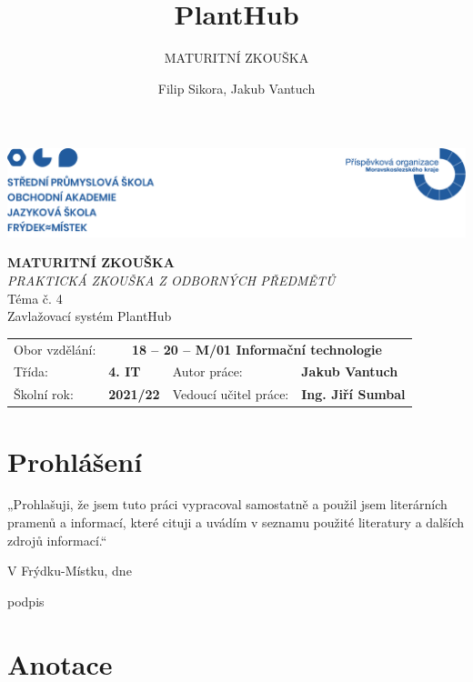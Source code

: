 \documentclass[12pt,a4paper]{article}
\title{PlantHub}
\subtitle{MATURITNÍ ZKOUŠKA }
\author{Filip Sikora, Jakub Vantuch}
\date{}
\newcommand*\wildcard[2][5cm]{\vspace*{2cm}\parbox{#1}{\centering\hrulefill\par#2\par}}
\begin{document}
\begin{titlepage}
	\noindent\includegraphics[width=\linewidth]{header.png}
	\vspace{1cm} \\
	\begin{center}
		\Huge\textbf{MATURITNÍ ZKOUŠKA}
		\vspace*{1.2cm} \\
		\large \emph{PRAKTICKÁ ZKOUŠKA Z ODBORNÝCH PŘEDMĚTŮ}
		\vspace*{5cm} \\
		\Large Téma č. 4 \\
		\vspace*{1cm}
		\Large Zavlažovací systém PlantHub \\
		\vfill
		\normalsize
	\end{center}
	\begin{tabularx}{\textwidth}{l@{\hskip 1.8cm}XXl}
		Obor vzdělání:        & \multicolumn{3}{c}{\textbf{18 – 20 –
				M/01
				Informační technologie}}
		\\[10pt]
		Třída:                & \textbf{4. IT}
		                      &
		Autor práce:          & \textbf{Jakub Vantuch}
		\\[10pt]
		Školní rok:           & \textbf{2021/22}
		                      &
		Vedoucí učitel práce: &
		\textbf{Ing. Jiří Sumbal}
	\end{tabularx}
\end{titlepage}

\section*{Prohlášení}

„Prohlašuji, že jsem tuto práci vypracoval samostatně a použil jsem literárních
pramenů a informací, které cituji a uvádím v seznamu použité literatury a
dalších zdrojů informací.“

\begingroup
\centering
\wildcard{V Frýdku-Místku, dne}
\hspace{1cm}
\wildcard{podpis}
\par
\endgroup

\clearpage

\section*{Anotace}
\end{document}

